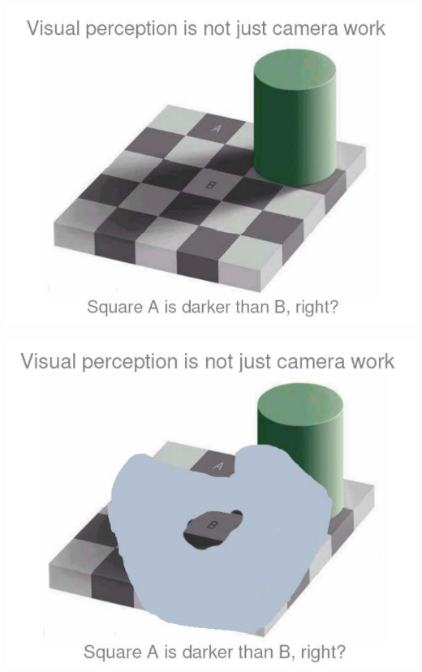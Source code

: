 \documentclass{beamer}
\begin{document}
\begin{frame}{}
    \begin{center}
        \includegraphics[scale=0.3]{visualParadox1.png}
    \end{center}
\end{frame}  
\begin{frame}{}
    \begin{center}
        \includegraphics[scale=0.3]{visualParadox2.png}
    \end{center}
\end{frame}  
\end{document}
